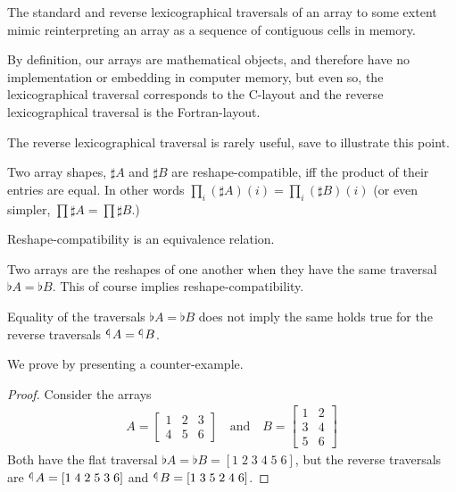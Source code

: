 \documentclass{DIKU-report-variant}
\newcommand\tlaf{\mathop{\rotatebox[origin=c]{180}{$\flat$}}}
\begin{document}
\begin{observation}
  \label{ob:c-fortran-order}
  The standard and reverse lexicographical traversals of an array to some extent
  mimic reinterpreting an array as a sequence of contiguous cells in memory.

  By definition, our arrays are mathematical objects, and therefore have no
  implementation or embedding in computer memory, but even so, the lexicographical
  traversal corresponds to the C-layout and the reverse lexicographical
  traversal is the Fortran-layout.

  The reverse lexicographical traversal is rarely useful, save to illustrate
  this point.
\end{observation}

\begin{definition}
  \label{def:reshape-comp} 
  Two array shapes, \(\sharp A\) and \(\sharp B\) are reshape-compatible, iff the product
  of their entries are equal. In other words
  \(\prod_{i} (\sharp A)(i) = \prod_{i} (\sharp B)(i)\) (or even simpler,
  \(\prod \sharp A = \prod \sharp B\).)

  Reshape-compatibility is an equivalence relation.
\end{definition}

\begin{definition}
  \label{def:reshape-equiv}
  Two arrays are the reshapes of one another when they have the same traversal
  \(\flat A = \flat B\). This of course implies reshape-compatibility.
\end{definition}

\begin{theorem}
  Equality of the traversals
  \(\flat A = \flat B\) does not imply the same holds true
  for the reverse traversals \(\tlaf A = \tlaf B\).

  We prove by presenting a counter-example.
\end{theorem}
\begin{proof}
  Consider the arrays
  \begin{align*}
    A =
    \begin{bmatrix}
      1 & 2 & 3 \\
      4 & 5 & 6
    \end{bmatrix}
    \quad\text{and}\quad
    B =
    \begin{bmatrix}
      1 & 2 \\
      3 & 4 \\
      5 & 6
    \end{bmatrix}
  \end{align*}
  Both have the flat traversal \(\flat A = \flat B = [1\; 2\; 3\; 4\; 5\; 6]\),
  but the reverse traversals are \(\tlaf A = [1\; 4\; 2\; 5\; 3\; 6]\) and
  \(\tlaf B = [1\; 3\; 5\; 2\; 4\; 6]\).
\end{proof}
\end{document}
